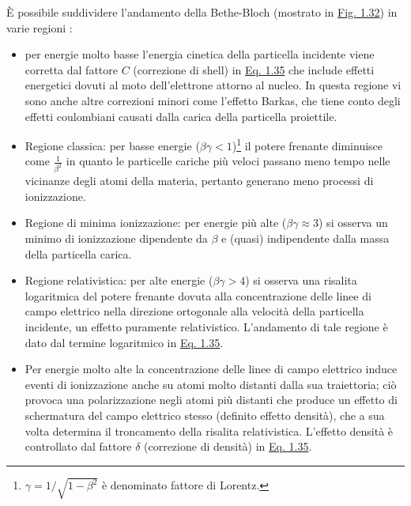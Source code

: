 \documentclass[12pt,a4paper,twoside]{report}
\begin{document}
	\`E possibile suddividere l'andamento della Bethe-Bloch (mostrato in \hyperref[fig:bethe_bloch]{Fig. 1.32}) in varie regioni \cite{Christodoulides2016}:
	\begin{itemize}
		\item per energie molto basse l'energia cinetica della particella incidente viene corretta dal fattore $C$ (correzione di shell) in \hyperref[eq:bethe_bloch]{Eq. 1.35} che include effetti energetici dovuti al moto dell'elettrone attorno al nucleo. In questa regione vi sono anche altre correzioni minori come l'effetto Barkas, che tiene conto degli effetti coulombiani causati dalla carica della particella proiettile.
		\item Regione classica: per basse energie ($\beta\gamma<1$)\footnote{$\gamma=1/\sqrt{1-\beta^2}$ è denominato fattore di Lorentz.} il potere frenante diminuisce come $\frac{1}{\beta^2}$ in quanto le particelle cariche più veloci passano meno tempo nelle vicinanze degli atomi della materia, pertanto generano meno processi di ionizzazione.
		\item Regione di minima ionizzazione: per energie più alte ($\beta\gamma\approx3$) si osserva un minimo di ionizzazione dipendente da $\beta$ e (quasi) indipendente dalla massa della particella carica.
		\item Regione relativistica: per alte energie ($\beta\gamma>4$) si osserva una risalita logaritmica del potere frenante dovuta alla concentrazione delle linee di campo elettrico nella direzione ortogonale alla velocità della particella incidente, un effetto puramente relativistico. L'andamento di tale regione è dato dal termine logaritmico in \hyperref[eq:bethe_bloch]{Eq. 1.35}.
		\item Per energie molto alte la concentrazione delle linee di campo elettrico induce eventi di ionizzazione anche su atomi molto distanti dalla sua traiettoria; ciò provoca una polarizzazione negli atomi più distanti che produce un effetto di schermatura del campo elettrico stesso (definito effetto densità), che a sua volta determina il troncamento della risalita relativistica. L'effetto densità è controllato dal fattore $\delta$ (correzione di densità) in \hyperref[eq:bethe_bloch]{Eq. 1.35}.
	\end{itemize}
\end{document}
